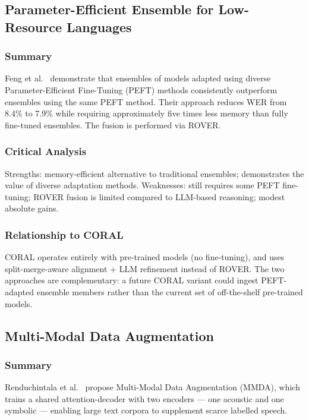 \subsection{Parameter-Efficient Ensemble for Low-Resource Languages}
\label{ssec:lit-feng}

\subsubsection{Summary}
Feng et al.~\cite{feng2024low} demonstrate that ensembles of models adapted using diverse Parameter-Efficient Fine-Tuning (PEFT) methods consistently outperform ensembles using the same PEFT method. Their approach reduces WER from 8.4\% to 7.9\% while requiring approximately five times less memory than fully fine-tuned ensembles. The fusion is performed via ROVER.

\subsubsection{Critical Analysis}
Strengths: memory-efficient alternative to traditional ensembles; demonstrates the value of diverse adaptation methods. Weaknesses: still requires some PEFT fine-tuning; ROVER fusion is limited compared to LLM-based reasoning; modest absolute gains.

\subsubsection{Relationship to CORAL}
CORAL operates entirely with pre-trained models (no fine-tuning), and uses split-merge-aware alignment + LLM refinement instead of ROVER. The two approaches are complementary: a future CORAL variant could ingest PEFT-adapted ensemble members rather than the current set of off-the-shelf pre-trained models.

\subsection{Multi-Modal Data Augmentation}
\label{ssec:lit-mmda}

\subsubsection{Summary}
Renduchintala et al.~\cite{renduchintala2018mmda} propose Multi-Modal Data Augmentation (MMDA), which trains a shared attention-decoder with two encoders --- one acoustic and one symbolic --- enabling large text corpora to supplement scarce labelled speech.


